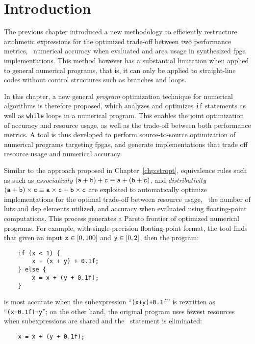 \section{Introduction}
\label{po:sec:introduction}

The previous chapter introduced a new methodology to efficiently restructure
arithmetic expressions for the optimized trade-off between two performance
metrics, \ie~numerical accuracy when evaluated and area usage in synthesized
\gls{fpga} implementations.  This method however has a substantial limitation
when applied to general numerical programs, that is, it can only be applied to
straight-line codes without control structures such as branches and loops.

In this chapter, a new general \emph{program} optimization technique for
numerical algorithms is therefore proposed, which analyzes and optimizes
\texttt{if} statements as well as \texttt{while} loops in a numerical program.
This enables the joint optimization of accuracy and resource usage, as well
as the trade-off between both performance metrics.  A tool is thus developed
to perform source-to-source optimization of numerical programs targeting
\glspl{fpga}, and generate implementations that trade off resource usage and
numerical accuracy.


Similar to the approach proposed in Chapter~\ref{chp:stropt}, equivalence
rules such as such as \emph{associativity} $(\texttt{a} + \texttt{b}) + \texttt{c} \equiv
\texttt{a} + (\texttt{b} + \texttt{c})$, and \emph{distributivity} $(\texttt{a} + \texttt{b}) \times
\texttt{c} \equiv \texttt{a} \times \texttt{c} + \texttt{b} \times \texttt{c}$ are exploited to
automatically optimize implementations for the optimal trade-off between
resource usage, \ie~the number of \glspl{lut} and \gls{dsp} elements utilized,
and accuracy when evaluated using floating-point computations.  This process
generates a Pareto frontier of optimized numerical programs.  For example, with
single-precision floating-point format, the tool finds that given an input
$\texttt{x} \in [0, 100]$ and $\texttt{y} \in [0, 2]$, then the program:
\begin{minipage}{\linewidth}
\begin{lstlisting}
    if (x < 1) {
        x = (x + y) + 0.1f;
    } else {
        x = x + (y + 0.1f);
    }
\end{lstlisting}
\end{minipage}
is most accurate when the subexpression ``\verb|(x+y)+0.1f|'' is rewritten
as ``\verb|(x+0.1f)+y|''; on the other hand, the original program uses
fewest resources when subexpressions are shared and the \iflit~statement is
eliminated:
\begin{lstlisting}
    x = x + (y + 0.1f);
\end{lstlisting}

